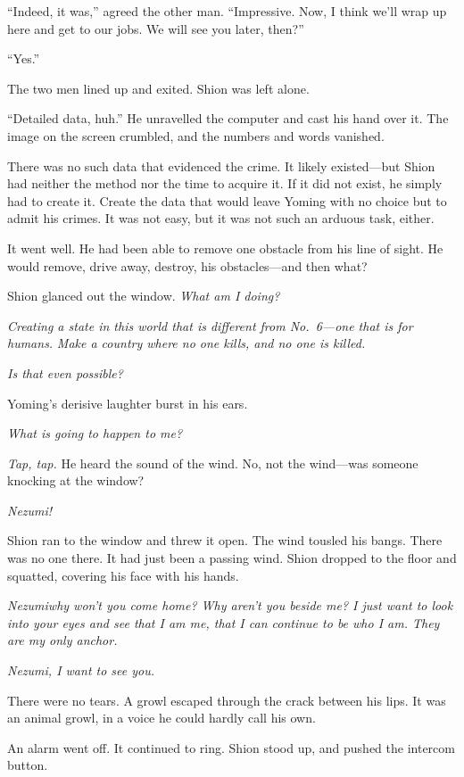 ``Indeed, it was,'' agreed the other man. ``Impressive. Now, I think
we'll wrap up here and get to our jobs. We will see you later, then?''

``Yes.''

The two men lined up and exited. Shion was left alone.

``Detailed data, huh.'' He unravelled the computer and cast his hand
over it. The image on the screen crumbled, and the numbers and words
vanished.

There was no such data that evidenced the crime. It likely existed---but
Shion had neither the method nor the time to acquire it. If it did not
exist, he simply had to create it. Create the data that would leave
Yoming with no choice but to admit his crimes. It was not easy, but it
was not such an arduous task, either.

It went well. He had been able to remove one obstacle from his line of
sight. He would remove, drive away, destroy, his obstacles---and then
what?

Shion glanced out the window.
\emph{What am I doing?}

\emph{Creating a state in this world that is different from No.~6---one that is
for humans.}
\emph{Make a country where no one kills, and no one is killed.}

\emph{Is that even possible?}

Yoming's derisive laughter burst in his ears.

\emph{What is going to happen to me?}

\mybreak

\emph{Tap, tap.} He heard the sound of the wind. No, not the wind---was someone
knocking at the window?

\emph{Nezumi!}

Shion ran to the window and threw it open. The wind tousled his bangs.
There was no one there. It had just been a passing wind. Shion dropped
to the floor and squatted, covering his face with his hands.

\emph{Nezumi\el why won't you come home? Why aren't you beside me? I just want
to look into your eyes and see that I am me, that I can continue to be
who I am. They are my only anchor.}

\emph{Nezumi, I want to see you.}

There were no tears. A growl escaped through the crack between his lips.
It was an animal growl, in a voice he could hardly call his own.

An alarm went off. It continued to ring. Shion stood up, and
pushed the intercom button.

